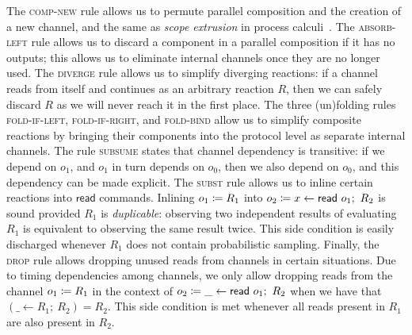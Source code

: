 The \textsc{comp-new} rule allows us to permute parallel composition and the creation of a new channel, and the same as \emph{scope
extrusion} in process calculi~\cite{picalc}. The \textsc{absorb-left} 
rule allows us to discard a component in a parallel composition if it has no outputs; this allows us to eliminate internal channels once they are no longer used. The \textsc{diverge} rule allows us to simplify diverging reactions: if a channel reads from itself and continues as an arbitrary reaction $R$, then we can safely discard $R$ as we will never reach it in the first place. The three (un)folding rules \textsc{fold-if-left}, \textsc{fold-if-right}, and \textsc{fold-bind} allow us to simplify composite reactions by bringing their
components into the protocol level as separate internal channels. The rule \textsc{subsume} states that channel dependency is transitive: if we depend on $o_1$, and $o_1$ in turn depends on $o_0$, then we also depend on $o_0$, and this dependency can be made explicit. The \textsc{subst} rule allows us to inline certain reactions into $\mathsf{read}$ commands. Inlining $o_1 \coloneqq R_1$ into $\assign{o_2}{x \leftarrow \read{o_1}; \ R_2}$ is sound provided $R_1$ is \emph{duplicable}: observing two independent results of evaluating $R_1$ is equivalent to observing the same result twice. This side condition is easily discharged whenever $R_1$ does not contain probabilistic
sampling. Finally, the \textsc{drop} rule allows dropping unused reads from channels in certain situations. Due to timing dependencies among channels, we only allow dropping reads from the channel $o_1 \coloneqq R_1$ in the context of $\assign{o_2}{\_ \leftarrow \read{o_1};\ R_2}$ when we have that $(\_ \leftarrow R_1; \ R_2) = R_2$. This side condition is met whenever all reads present in $R_1$ are also present in $R_2$.

